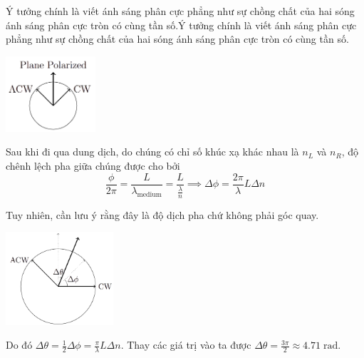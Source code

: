 \begin{solution} Ý tưởng chính là viết ánh sáng phân cực phẳng như sự chồng chất của hai sóng ánh sáng phân cực tròn có cùng tần số.Ý tưởng chính là viết ánh sáng phân cực phẳng như sự chồng chất của hai sóng ánh sáng phân cực tròn có cùng tần số.
\begin{center}
    \includegraphics[width=0.25\textwidth]{solutions/figures/polarization-decomposition.png}
\end{center}
    
Sau khi đi qua dung dịch, do chúng có chỉ số khúc xạ khác nhau là $n_L$ và $n_R$, độ chênh lệch pha giữa chúng được cho bởi
$$\frac{\phi}{2\pi} = \frac{L}{\lambda_{\text{medium}}} = \frac{L}{\frac{\lambda}{n}} \implies \Delta \phi = \frac{2\pi}{\lambda}L\Delta n$$
    
Tuy nhiên, cần lưu ý rằng đây là độ dịch pha chứ không phải góc quay.

\begin{center}
    \includegraphics[width=0.3\textwidth]{solutions/figures/rotation-shift.png}
\end{center}
    
Do đó $\Delta \theta = \frac{1}{2}\Delta \phi = \frac{\pi}{\lambda} L \Delta n$. Thay các giá trị vào ta được $\boxed{\Delta \theta = \frac{3\pi}{2} \approx 4.71\;\mathrm{rad}}$.

\end{solution}